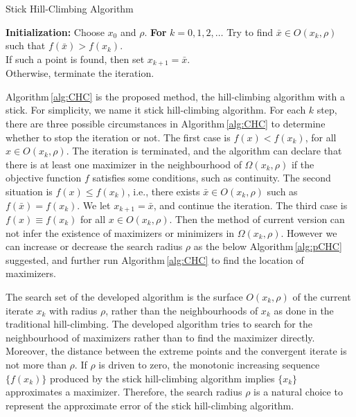 \documentclass[mathpazo]{aamm}
\newcommand{\bmx}{x}
\begin{document}
\begin{algorithm}[]
	\caption{Stick Hill-Climbing Algorithm} 
	\label{alg:CHC}
\begin{algorithmic}[]
	\STATE \textbf{Initialization:} Choose $\bmx_0$ and $\rho$.
	\STATE \textbf{For} $k=0,1,2,\dots$
	\STATE \hspace{0.5cm} Try to find $\bar{\bmx}\in O(\bmx_k,
	\rho)$
		   such that $f(\bar\bmx)>f(\bmx_k)$. 
			\\
		 \hspace{0.5cm} If such a point is found, then set $\bmx_{k+1}= \bar\bmx$.
		  \\
	 	  \hspace{0.5cm} Otherwise, terminate the iteration.
\end{algorithmic}
\end{algorithm}
Algorithm\,\ref{alg:CHC} is the proposed method, the hill-climbing algorithm with a stick.
For simplicity, we name it stick hill-climbing algorithm. 
For each $k$ step, there are three possible circumstances in 
Algorithm\,\ref{alg:CHC} to determine whether to stop the iteration or not. 
The first case is $f(\bmx)<f(\bmx_k)$, for all $\bmx\in O(\bmx_k,
\rho)$. The iteration is terminated, and the algorithm can declare
that there is at least one maximizer in the neighbourhood of $\Omega(\bmx_k,
\rho)$ if the objective function $f$ satisfies some conditions, such as continuity.
The second situation is $f(\bmx)\leq f(\bmx_k)$, i.e., there exists 
$\bar\bmx\in O(\bmx_k, \rho)$ such as $f(\bar\bmx)=f(\bmx_k)$.
We let $\bmx_{k+1}= \bar\bmx$, and continue the iteration.
The third case is $f(\bmx)\equiv f(\bmx_k)$ for all
$\bmx\in O(\bmx_k, \rho)$. Then the method of current 
version can not infer the existence of maximizers or minimizers
in $\Omega(\bmx_k, \rho)$. However we can increase or
decrease the search radius $\rho$ as the below Algorithm\,\ref{alg:pCHC}
suggested, and further run Algorithm\,\ref{alg:CHC} to find the
location of maximizers. 

The search set of the developed algorithm is the surface
$O(x_k, \rho)$ of the current iterate $x_k$ with radius
$\rho$, rather than the
neighbourhoods of $x_k$ as done in the traditional hill-climbing.
The developed algorithm tries to search for the neighbourhood of
maximizers rather than to find the maximizer directly.
Moreover, the distance between the extreme points and the
convergent iterate is not more than $\rho$.
If $\rho$ is driven to zero, the monotonic increasing sequence
$ \{f(\bmx_k)\}$ produced by the stick hill-climbing algorithm
implies $\{\bmx_k\}$ approximates a maximizer.
Therefore, the search radius $\rho$ is a natural choice to
represent the approximate error of the stick hill-climbing algorithm. 
\end{document}

